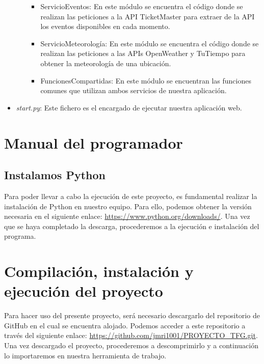 \begin{itemize}
\begin{itemize}
\begin{itemize}
            \item ServicioEventos: En este módulo se encuentra el código donde se realizan las peticiones a la API TicketMaster para extraer de la API los eventos disponibles en cada momento.

            \item ServicioMeteorología: En este módulo se encuentra el código donde se realizan las peticiones a las APIs OpenWeather y TuTiempo para obtener la meteorología de una ubicación.

            \item FuncionesCompartidas: En este módulo se encuentran las funciones comunes que utilizan ambos servicios de nuestra aplicación.
            
        \end{itemize}
        
    \end{itemize}
    
    \item \textit{start.py}: Este fichero es el encargado de ejecutar nuestra aplicación web.
    
\end{itemize}

\section{Manual del programador}

\subsection{Instalamos Python}

Para poder llevar a cabo la ejecución de este proyecto, es fundamental realizar la instalación de Python en nuestro equipo. Para ello, podemos obtener la versión necesaria en el siguiente enlace: \url{ https://www.python.org/downloads/}. Una vez que se haya completado la descarga, procederemos a la ejecución e instalación del programa.

\section{Compilación, instalación y ejecución del proyecto}

Para hacer uso del presente proyecto, será necesario descargarlo del repositorio de GitHub en el cual se encuentra alojado. Podemos acceder a este repositorio a través del siguiente enlace: \url{https://github.com/jmri1001/PROYECTO_TFG.git}. Una vez descargado el proyecto, procederemos a descomprimirlo y a continuación lo importaremos en nuestra herramienta de trabajo.

